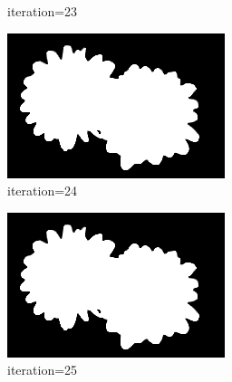 \documentclass{article}
\begin{document}
\begin{figure}[t]
\begin{subfigure}[t]{0.19\textwidth}
\vspace{-0.6cm}
\caption{iteration=23}
\end{subfigure}
\begin{subfigure}[t]{0.19\textwidth}
\centering
\includegraphics[width=\textwidth]{./images/marginals_iter_24.png}
\vspace{-0.6cm}
\caption{iteration=24}
\end{subfigure}
\begin{subfigure}[t]{0.19\textwidth}
\centering
\includegraphics[width=\textwidth]{./images/marginals_iter_25.png}
\vspace{-0.6cm}
\caption{iteration=25}
\end{subfigure}
\begin{subfigure}[t]{0.19\textwidth}
\centering

\end{subfigure}
\end{figure}
\end{document}
